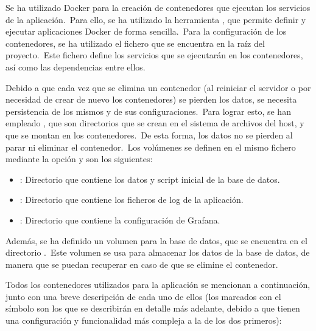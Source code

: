 
Se ha utilizado Docker para la creación de contenedores que ejecutan los servicios de la aplicación.\ Para ello, se ha
utilizado la herramienta , que permite definir y ejecutar aplicaciones Docker de forma
sencilla.\ Para la configuración de los contenedores, se ha utilizado el fichero  que se
encuentra en la raíz del proyecto.\ Este fichero define los servicios que se ejecutarán en los contenedores, así como
las dependencias entre ellos.

Debido a que cada vez que se elimina un contenedor (al reiniciar el servidor o por necesidad de crear de nuevo los
contenedores) se pierden los datos, se necesita persistencia de los mismos
y de sus configuraciones.\ Para lograr esto, se han empleado , que son
directorios que se crean en el sistema de archivos del host, y que se montan en los contenedores.\ De esta forma, los
datos no se pierden al parar ni eliminar el contenedor.\ Los volúmenes se definen en el mismo fichero
 mediante la opción  y son los siguientes:

\begin{itemize}
	\item {}: Directorio que contiene los datos y script inicial de la base de datos.
	\item {}: Directorio que contiene los ficheros de log de la aplicación.
	\item {}: Directorio que contiene la configuración de Grafana.
\end{itemize}

Además, se ha definido un volumen para la base de datos, que se encuentra en el
directorio .\ Este volumen se usa para almacenar los datos de la base de datos, de manera que se
puedan recuperar en caso de que se elimine el contenedor.

Todos los contenedores utilizados para la aplicación se mencionan a continuación, junto con una breve descripción de
cada uno de ellos (los marcados con el símbolo \textsuperscript{\textasteriskcentered} son los que se describirán en
detalle más adelante, debido a que tienen una configuración y funcionalidad más compleja a la de los dos primeros):

